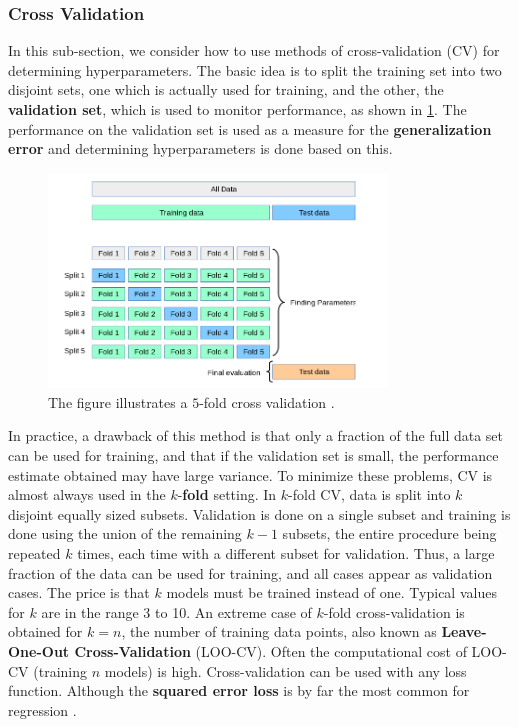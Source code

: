 \documentclass[10pt]{article}
\theoremstyle{definition}
\begin{document}
\subsubsection{Cross Validation}
In this sub-section, we consider how to use methods of cross-validation (CV) for determining hyperparameters. The basic idea is to split the training set into two disjoint sets, one which is actually used for training, and the other, the \textbf{validation set}, which is used to monitor performance, as shown in \cref{fig:cross:validation}. The performance on the validation set is used as a measure for the \textbf{generalization error} and determining hyperparameters is done based on this.
\begin{figure}[b!]
\centering
\includegraphics[width=9cm]{figs/cross-validation.png}
\caption{The figure illustrates a $5$-fold cross validation \cite{sklearn}.}
\label{fig:cross:validation}
\end{figure}
In practice, a drawback of this method is that only a fraction of the full data set can be used for training, and that if the validation set is small, the performance estimate obtained may have large variance. To minimize these problems, CV is almost always used in the $k$-\textbf{fold} setting. In $k$-fold CV, data is split into $k$ disjoint equally sized subsets. Validation is done on a single subset and training is done using the union of the remaining $k -1$ subsets, the entire procedure being repeated $k$ times, each time with a different subset for validation. Thus, a large fraction of the data can be used for training, and all cases appear as validation cases. The price is that $k$ models must be trained instead of one. Typical values for $k$ are in the range 3 to 10. An extreme case of $k$-fold cross-validation is obtained for $k = n$, the number of training data points, also known as \textbf{Leave-One-Out Cross-Validation} (LOO-CV). Often the computational cost of LOO-CV (training $n$ models) is high. Cross-validation can be used with any loss function. Although the \textbf{squared error loss} is by far the most common for regression \cite[Chapter 5]{Rasmussen2006}. 
\end{document}

